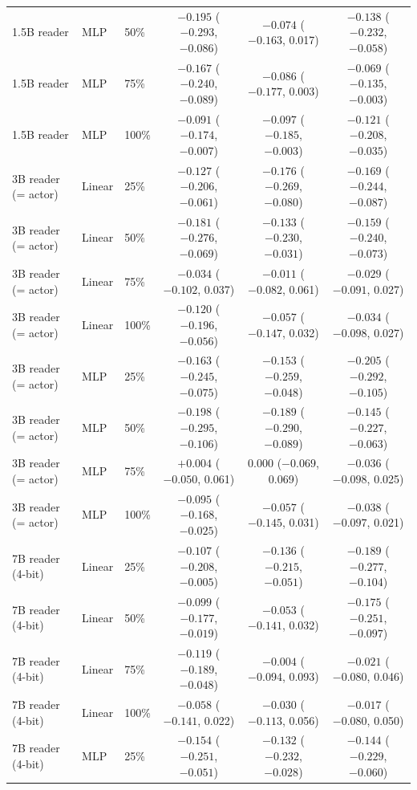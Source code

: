 \begin{table}[htbp]
\begin{tabular}{@{}lllccc@{}}
1.5B reader & MLP & 50\% & $-0.195$ ($-0.293$, $-0.086$) & $-0.074$ ($-0.163$, 0.017) & $-0.138$ ($-0.232$, $-0.058$) \\
1.5B reader & MLP & 75\% & $-0.167$ ($-0.240$, $-0.089$) & $-0.086$ ($-0.177$, 0.003) & $-0.069$ ($-0.135$, $-0.003$) \\
1.5B reader & MLP & 100\% & $-0.091$ ($-0.174$, $-0.007$) & $-0.097$ ($-0.185$, $-0.003$) & $-0.121$ ($-0.208$, $-0.035$) \\
3B reader (= actor) & Linear & 25\% & $-0.127$ ($-0.206$, $-0.061$) & $-0.176$ ($-0.269$, $-0.080$) & $-0.169$ ($-0.244$, $-0.087$) \\
3B reader (= actor) & Linear & 50\% & $-0.181$ ($-0.276$, $-0.069$) & $-0.133$ ($-0.230$, $-0.031$) & $-0.159$ ($-0.240$, $-0.073$) \\
3B reader (= actor) & Linear & 75\% & $-0.034$ ($-0.102$, 0.037) & $-0.011$ ($-0.082$, 0.061) & $-0.029$ ($-0.091$, 0.027) \\
3B reader (= actor) & Linear & 100\% & $-0.120$ ($-0.196$, $-0.056$) & $-0.057$ ($-0.147$, 0.032) & $-0.034$ ($-0.098$, 0.027) \\
3B reader (= actor) & MLP & 25\% & $-0.163$ ($-0.245$, $-0.075$) & $-0.153$ ($-0.259$, $-0.048$) & $-0.205$ ($-0.292$, $-0.105$) \\
3B reader (= actor) & MLP & 50\% & $-0.198$ ($-0.295$, $-0.106$) & $-0.189$ ($-0.290$, $-0.089$) & $-0.145$ ($-0.227$, $-0.063$) \\
3B reader (= actor) & MLP & 75\% & $+0.004$ ($-0.050$, 0.061) & 0.000 ($-0.069$, 0.069) & $-0.036$ ($-0.098$, 0.025) \\
3B reader (= actor) & MLP & 100\% & $-0.095$ ($-0.168$, $-0.025$) & $-0.057$ ($-0.145$, 0.031) & $-0.038$ ($-0.097$, 0.021) \\
7B reader (4-bit) & Linear & 25\% & $-0.107$ ($-0.208$, $-0.005$) & $-0.136$ ($-0.215$, $-0.051$) & $-0.189$ ($-0.277$, $-0.104$) \\
7B reader (4-bit) & Linear & 50\% & $-0.099$ ($-0.177$, $-0.019$) & $-0.053$ ($-0.141$, 0.032) & $-0.175$ ($-0.251$, $-0.097$) \\
7B reader (4-bit) & Linear & 75\% & $-0.119$ ($-0.189$, $-0.048$) & $-0.004$ ($-0.094$, 0.093) & $-0.021$ ($-0.080$, 0.046) \\
7B reader (4-bit) & Linear & 100\% & $-0.058$ ($-0.141$, 0.022) & $-0.030$ ($-0.113$, 0.056) & $-0.017$ ($-0.080$, 0.050) \\
7B reader (4-bit) & MLP & 25\% & $-0.154$ ($-0.251$, $-0.051$) & $-0.132$ ($-0.232$, $-0.028$) & $-0.144$ ($-0.229$, $-0.060$) \\

\end{tabular}
\end{table}
